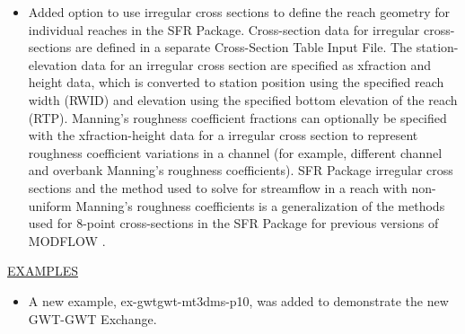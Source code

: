 \documentclass[11pt,twoside,twocolumn]{usgsreport}
\begin{document}
\begin{itemize}
\begin{itemize}
	        \item Added option to use irregular cross sections to define the reach geometry for individual reaches in the SFR Package. Cross-section data for irregular cross-sections are defined in a separate Cross-Section Table Input File. The station-elevation data for an irregular cross section are specified as xfraction and height data, which is converted to station position using the specified reach width (RWID) and elevation using the specified bottom elevation of the reach (RTP). Manning's roughness coefficient fractions can optionally be specified with the xfraction-height data for a irregular cross section to represent roughness coefficient variations in a channel (for example, different channel and overbank Manning's roughness coefficients). SFR Package irregular cross sections and the method used to solve for streamflow in a reach with non-uniform Manning's roughness coefficients is a generalization of the methods used for 8-point cross-sections in the SFR Package for previous versions of MODFLOW \citep{modflowsfr1pack}. 
	\end{itemize}
	
	\underline{EXAMPLES}
	\begin{itemize}
	        \item A new example, ex-gwtgwt-mt3dms-p10, was added to demonstrate the new GWT-GWT Exchange.  
	\end{itemize}


\end{itemize}
\end{document}

